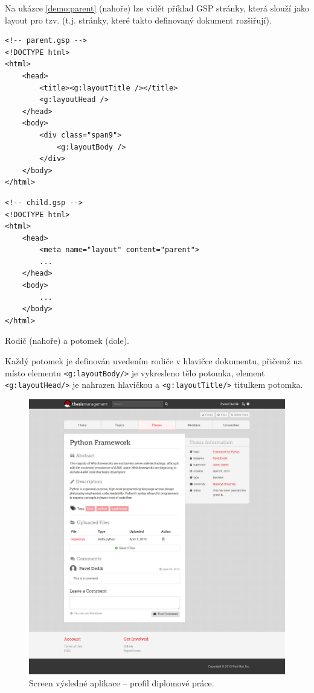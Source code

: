 Na ukázce \ref{demo:parent} (nahoře) lze vidět příklad GSP stránky, která slouží jako layout pro tzv.  (t.j. stránky, které takto definovaný dokument rozšiřují).

\begin{demo}
    \centering
    \begin{lstlisting}[language=html5]
<!-- parent.gsp -->
<!DOCTYPE html>
<html>
    <head>
        <title><g:layoutTitle /></title>
        <g:layoutHead />
    </head>
    <body>
        <div class="span9">
            <g:layoutBody />
        </div>
    </body>
</html>
    \end{lstlisting}
    \begin{lstlisting}[language=html5]
<!-- child.gsp -->
<!DOCTYPE html>
<html>
    <head>
        <meta name="layout" content="parent">
        ...
    </head>
    <body>
        ...
    </body>
</html>
    \end{lstlisting}
    \caption{Rodič (nahoře) a potomek (dole).}
    \label{demo:parent}
\end{demo}

Každý potomek je definován uvedením rodiče v hlavičce dokumentu, přičemž na místo elementu \texttt{<g:layoutBody/>} je vykresleno tělo potomka, element \texttt{<g:layoutHead/>} je nahrazen hlavičkou a \texttt{<g:layoutTitle/>} titulkem potomka.

\begin{figure}[htbp]
    \centering
    \includegraphics[width=\textwidth]{images/tms.png}
    \caption{Screen výsledné aplikace -- profil diplomové práce.}
    \label{img:tms}
\end{figure}
